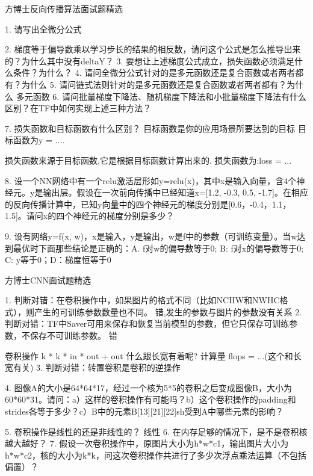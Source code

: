 方博士反向传播算法面试题精选

1. 请写出全微分公式

2. 梯度等于偏导数乘以学习步长的结果的相反数，请问这个公式是怎么推导出来的？为什么其中没有deltaY？
3. 要想让上述梯度公式成立，损失函数必须满足什么条件？为什么？
4. 请问全微分公式针对的是多元函数还是复合函数或者两者都有？为什么
5. 请问链式法则针对的是多元函数还是复合函数或者两者都有？为什么
多元函数
6. 请问批量梯度下降法、随机梯度下降法和小批量梯度下降法有什么区别？在TF中如何实现上述三种方法？

7. 损失函数和目标函数有什么区别？
目标函数是你的应用场景所要达到的目标
目标函数为y = ....

损失函数来源于目标函数,它是根据目标函数计算出来的.
损失函数为:loss = ...

8. 设一个NN网络中有一个relu激活层形如y=relu(x)，其中x是输入向量，含4个神经元。y是输出层。假设在一次前向传播中已经知道x=[1.2, -0.3, 0.5, -1.7]。在相应的反向传播计算中，已知y向量中的四个神经元的梯度分别是[0.6，-0.4，1.1，1.5]。请问x的四个神经元的梯度分别是多少？

9. 设有网络y=f(x, w)，x是输入，y是输出，w是f中的参数（可训练变量）。当w达到最优时下面那些结论是正确的：A. f对w的偏导数等于0; B: f对x的偏导数等于0; C: y等于0；D：梯度恒等于0

方博士CNN面试题精选

1. 判断对错：在卷积操作中，如果图片的格式不同（比如NCHW和NWHC格式），则产生的可训练参数数量也不同。
错,发生的参数与图片的参数没有关系
2. 判断对错：TF中Saver可用来保存和恢复当前模型的参数，但它只保存可训练参数，不保存不可训练参数。
错

卷积操作 k * k * in * out + out
什么跟长宽有着呢?
计算量
flops = ...(这个和长宽有关)
3. 判断对错：转置卷积是卷积的逆操作

4. 图像A的大小是64*64*17，经过一个核为5*5的卷积之后变成图像B，大小为60*60*31。请问：a）这样的卷积操作有可能吗？b）这个卷积操作的padding和strides各等于多少？c）B中的元素B[13][21][22]sh受到A中哪些元素的影响？

5. 卷积操作是线性的还是非线性的？
线性
6. 在内存足够的情况下，是不是卷积核越大越好？
7. 假设一次卷积操作中，原图片大小为h*w*c1，输出图片大小为h*w*c2，核的大小为k*k，问这次卷积操作共进行了多少次浮点乘法运算（不包括偏置）？

